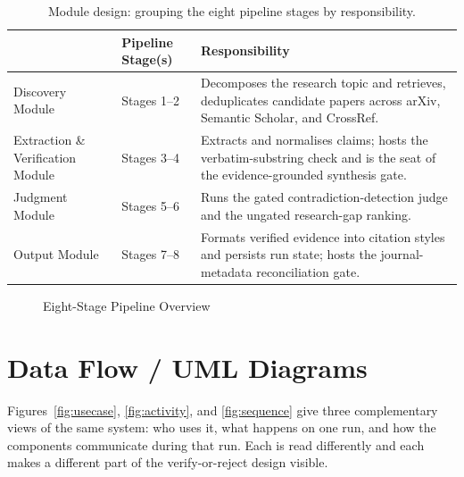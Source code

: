 \documentclass[12pt,a4paper]{report}
\newcommand{\headrow}{\rowcolor{navy}}
\newcommand{\hd}[1]{{\color{white}\bfseries #1}}
\begin{document}
\begin{table}[H]
\centering
\caption{Module design: grouping the eight pipeline stages by responsibility.}
\label{tab:modules}
\begin{tabular}{@{}p{3.7cm}p{2.8cm}p{6.9cm}@{}}
\toprule
\headrow \hd{Module} & \hd{Pipeline Stage(s)} & \hd{Responsibility} \\
\midrule
Discovery Module & Stages 1--2 & Decomposes the research topic and retrieves,
deduplicates candidate papers across arXiv, Semantic Scholar, and CrossRef. \\
Extraction \& Verification Module & Stages 3--4 & Extracts and normalises
claims; hosts the verbatim-substring check and is the seat of the
evidence-grounded synthesis gate. \\
Judgment Module & Stages 5--6 & Runs the gated contradiction-detection judge
and the ungated research-gap ranking. \\
Output Module & Stages 7--8 & Formats verified evidence into citation styles
and persists run state; hosts the journal-metadata reconciliation gate. \\
\bottomrule
\end{tabular}
\end{table}

\begin{figure}[H]
\centering
{}
\caption{Eight-Stage Pipeline Overview}
\label{fig:modules}
\end{figure}

\section{Data Flow / UML Diagrams}
Figures~\ref{fig:usecase}, \ref{fig:activity}, and \ref{fig:sequence} give
three complementary views of the same system: who uses it, what happens on one
run, and how the components communicate during that run. Each is read
differently and each makes a different part of the verify-or-reject design
visible.
\end{document}
